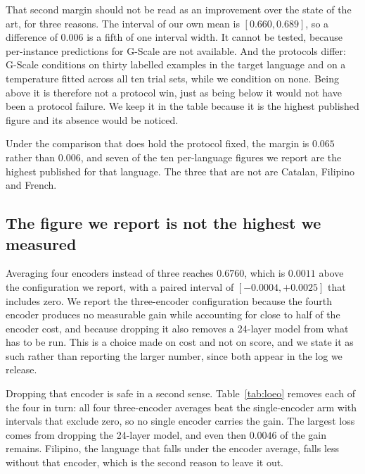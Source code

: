 That second margin should not be read as an improvement over the state
of the art, for three reasons. The interval of our own mean is
$[0.660, 0.689]$, so a difference of $0.006$ is a fifth of one interval
width. It cannot be tested, because per-instance predictions for
G-Scale are not available. And the protocols differ: G-Scale conditions
on thirty labelled examples in the target language and on a temperature
fitted across all ten trial sets, while we condition on none. Being
above it is therefore not a protocol win, just as being below it would
not have been a protocol failure. We keep it in the table because it is
the highest published figure and its absence would be noticed.

Under the comparison that does hold the protocol fixed, the margin is
$0.065$ rather than $0.006$, and seven of the ten per-language figures
we report are the highest published for that language. The three that
are not are Catalan, Filipino and French.

\subsection{The figure we report is not the highest we measured}
\label{sec:notmax}

Averaging four encoders instead of three reaches $0.6760$, which is
$0.0011$ above the configuration we report, with a paired interval of
$[-0.0004, +0.0025]$ that includes zero. We report the three-encoder
configuration because the fourth encoder produces no measurable gain
while accounting for close to half of the encoder cost, and because
dropping it also removes a 24-layer model from what has to be run. This
is a choice made on cost and not on score, and we state it as such
rather than reporting the larger number, since both appear in the log
we release.

Dropping that encoder is safe in a second sense. Table~\ref{tab:loeo}
removes each of the four in turn: all four three-encoder averages beat
the single-encoder arm with intervals that exclude zero, so no single
encoder carries the gain. The largest loss comes from dropping the
24-layer model, and even then $0.0046$ of the gain remains. Filipino,
the language that falls under the encoder average, falls less without
that encoder, which is the second reason to leave it out.

